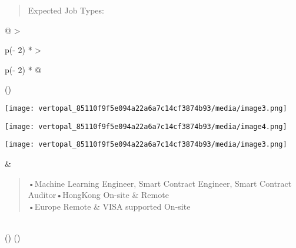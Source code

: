 \documentclass[
]{article}
\begin{document}
\begin{quote}
Expected Job Types:
\end{quote}

\begin{longtable}[]{@{}
  >{\raggedright\arraybackslash}p{(\columnwidth - 2\tabcolsep) * }
  >{\raggedright\arraybackslash}p{(\columnwidth - 2\tabcolsep) * }@{}}
\toprule()
\begin{minipage}[b]{\linewidth}\raggedright
\texttt{[image: vertopal\_85110f9f5e094a22a6a7c14cf3874b93/media/image3.png]}

\texttt{[image: vertopal\_85110f9f5e094a22a6a7c14cf3874b93/media/image4.png]}

\texttt{[image: vertopal\_85110f9f5e094a22a6a7c14cf3874b93/media/image3.png]}
\end{minipage} & \begin{minipage}[b]{\linewidth}\raggedright
\begin{quote}
•Machine Learning Engineer, Smart Contract Engineer, Smart Contract
Auditor•HongKong On-site \& Remote\\
•Europe Remote \& VISA supported On-site
\end{quote}\strut
\end{minipage} \\
\midrule()
\endhead
\bottomrule()
\end{longtable}
\end{document}
